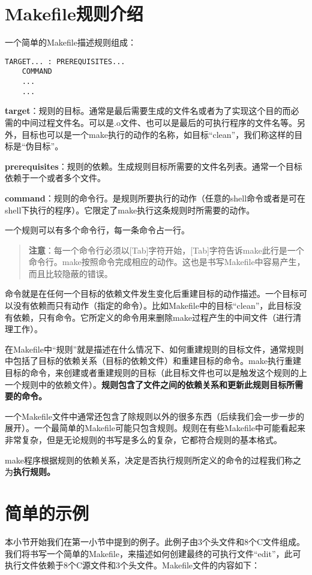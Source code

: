 \section{Makefile规则介绍}
一个简单的Makefile描述规则组成：
\begin{Verbatim}[]
TARGET... : PREREQUISITES...
    COMMAND
    ...
    ...
\end{Verbatim}

\textbf{target}：规则的目标。通常是最后需要生成的文件名或者为了实现这个目的而必需的中间过程文件名。可以是.o文件、也可以是最后的可执行程序的文件名等。另外，目标也可以是一个make执行的动作的名称，如目标“clean”，我们称这样的目标是“伪目标”。

\textbf{prerequisites}：规则的依赖。生成规则目标所需要的文件名列表。通常一个目标依赖于一个或者多个文件。

\textbf{command}：规则的命令行。是规则所要执行的动作（任意的shell命令或者是可在shell下执行的程序）。它限定了make执行这条规则时所需要的动作。

一个规则可以有多个命令行，每一条命令占一行。

\begin{quote}\kaishu
  \textbf{注意}：每一个命令行必须以[Tab]字符开始，[Tab]字符告诉make此行是一个命令行。make按照命令完成相应的动作。这也是书写Makefile中容易产生，而且比较隐蔽的错误。
\end{quote}

命令就是在任何一个目标的依赖文件发生变化后重建目标的动作描述。一个目标可以没有依赖而只有动作（指定的命令）。比如Makefile中的目标“clean”，此目标没有依赖，只有命令。它所定义的命令用来删除make过程产生的中间文件（进行清理工作）。


在Makefile中“规则”就是描述在什么情况下、如何重建规则的目标文件，通常规则中包括了目标的依赖关系（目标的依赖文件）和重建目标的命令。make执行重建目标的命令，来创建或者重建规则的目标（此目标文件也可以是触发这个规则的上一个规则中的依赖文件）。\textbf{规则包含了文件之间的依赖关系和更新此规则目标所需要的命令。}

一个Makefile文件中通常还包含了除规则以外的很多东西（后续我们会一步一步的展开）。一个最简单的Makefile可能只包含规则。规则在有些Makefile中可能看起来非常复杂，但是无论规则的书写是多么的复杂，它都符合规则的基本格式。

make程序根据规则的依赖关系，决定是否执行规则所定义的命令的过程我们称之为\textbf{执行规则。}


\section{简单的示例}
本小节开始我们在第一小节中提到的例子。此例子由3个头文件和8个C文件组成。我们将书写一个简单的Makefile，来描述如何创建最终的可执行文件“edit”，此可执行文件依赖于8个C源文件和3个头文件。Makefile文件的内容如下：

